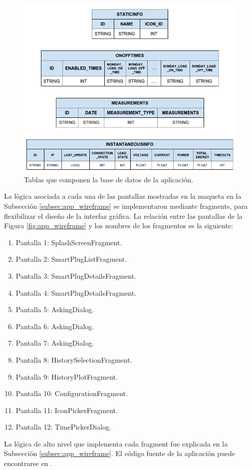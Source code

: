 \begin{figure}[h]
	\centering
	\includegraphics[width=13cm]{./Figures/3_3_2_tablas_sqlite.png}
	\caption{Tablas que componen la base de datos de la aplicación.}
	\label{fig:app_sqlite}
\end{figure}

La lógica asociada a cada una de las pantallas mostradas en la maqueta en la Subsección \ref{subsec:app_wireframe} se implementaron mediante fragments, para flexibilizar el diseño de la interfaz gráfica. La relación entre las pantallas de la Figura \ref{fig:app_wireframe} y los nombres de los fragmentos es la siguiente:

\begin{enumerate}
\item Pantalla 1: SplashScreenFragment.
\item Pantalla 2: SmartPlugListFragment.
\item Pantalla 3: SmartPlugDetailsFragment.
\item Pantalla 4: SmartPlugDetailsFragment.
\item Pantalla 5: AskingDialog.
\item Pantalla 6: AskingDialog.
\item Pantalla 7: AskingDialog.
\item Pantalla 8: HistorySelectionFragment.
\item Pantalla 9: HistoryPlotFragment.
\item Pantalla 10: ConfigurationFragment.
\item Pantalla 11: IconPickerFragment.
\item Pantalla 12: TimePickerDialog.
\end{enumerate}

La lógica de alto nivel que implementa cada fragment fue explicada en la Subsección \ref{subsec:app_wireframe}. El código fuente de la aplicación puede encontrarse en \citep{repo_app}.

